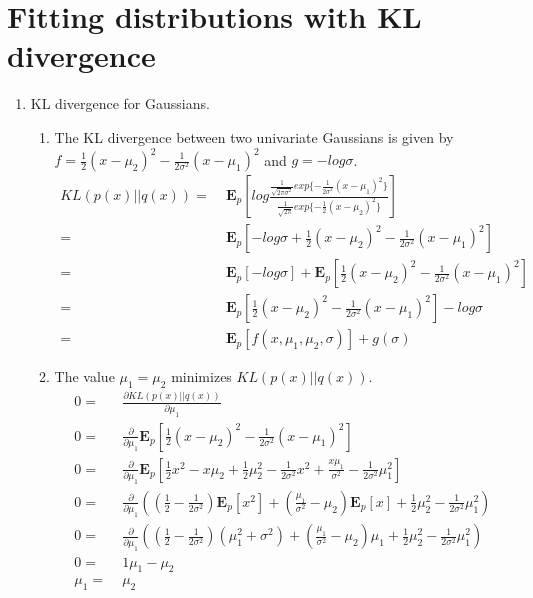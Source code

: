 \section{Fitting distributions with KL divergence}
\begin{enumerate}
\item KL divergence for Gaussians. 

\begin{enumerate}
\item The KL divergence between two univariate Gaussians is given by $f=\frac{1}{2}(x-\mu_{2})^{2}-\frac{1}{2\sigma^{2}}(x-\mu_{1})^{2}$
and $g=-log\sigma$. \begin{align*}
KL(p(x)||q(x))= & \;\mathbf{E}_{p}[log\frac{\frac{1}{\sqrt{2\pi\sigma^{2}}}exp\{-\frac{1}{2\sigma^{2}}(x-\mu_{1})^{2}\}}{\frac{1}{\sqrt{2\pi}}exp\{-\frac{1}{2}(x-\mu_{2})^{2}\}}]\\
= & \;\mathbf{E}_{p}[-log\sigma+\frac{1}{2}(x-\mu_{2})^{2}-\frac{1}{2\sigma^{2}}(x-\mu_{1})^{2}]\\
= & \;\mathbf{E}_{p}[-log\sigma]+\mathbf{E}_{p}[\frac{1}{2}(x-\mu_{2})^{2}-\frac{1}{2\sigma^{2}}(x-\mu_{1})^{2}]\\
= & \;\mathbf{E}_{p}[\frac{1}{2}(x-\mu_{2})^{2}-\frac{1}{2\sigma^{2}}(x-\mu_{1})^{2}]-log\sigma\\
= & \;\mathbf{E}_{p}[f(x,\mu_{1},\mu_{2},\sigma)]+g(\sigma)\end{align*}
 
\item The value $\mu_{1}=\mu_{2}$ minimizes $KL(p(x)||q(x))$. \begin{align*}
0= & \;\frac{\partial KL(p(x)||q(x))}{\partial\mu_{1}}\\
0= & \;\frac{\partial}{\partial\mu_{1}}\mathbf{E}_{p}[\frac{1}{2}(x-\mu_{2})^{2}-\frac{1}{2\sigma^{2}}(x-\mu_{1})^{2}]\\
0= & \;\frac{\partial}{\partial\mu_{1}}\mathbf{E}_{p}[\frac{1}{2}x^{2}-x\mu_{2}+\frac{1}{2}\mu_{2}^{2}-\frac{1}{2\sigma^{2}}x^{2}+\frac{x\mu_{1}}{\sigma^{2}}-\frac{1}{2\sigma^{2}}\mu_{1}^{2}]\\
0= & \;\frac{\partial}{\partial\mu_{1}}((\frac{1}{2}-\frac{1}{2\sigma^{2}})\mathbf{E}_{p}[x^{2}]+(\frac{\mu_{1}}{\sigma^{2}}-\mu_{2})\mathbf{E}_{p}[x]+\frac{1}{2}\mu_{2}^{2}-\frac{1}{2\sigma^{2}}\mu_{1}^{2})\\
0= & \;\frac{\partial}{\partial\mu_{1}}((\frac{1}{2}-\frac{1}{2\sigma^{2}})(\mu_{1}^{2}+\sigma^{2})+(\frac{\mu_{1}}{\sigma^{2}}-\mu_{2})\mu_{1}+\frac{1}{2}\mu_{2}^{2}-\frac{1}{2\sigma^{2}}\mu_{1}^{2})\\
0= & \;1\mu_{1}-\mu_{2}\\
\mu_{1}= & \;\mu_{2}\end{align*}
 

\end{enumerate}
\end{enumerate}
